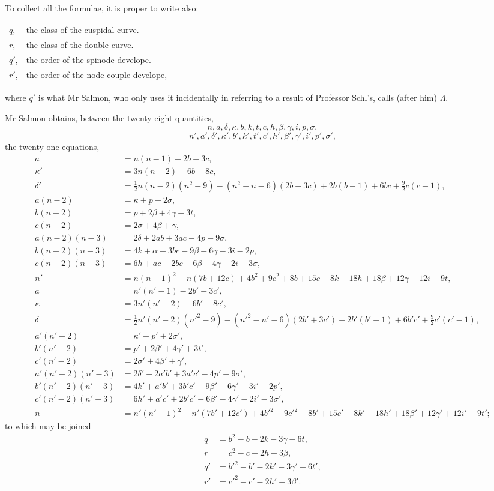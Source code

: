 \documentclass[11pt,a4paper]{book}
\theoremstyle{plain}
\begin{document}
To collect all the formulae, it is proper to write also:

\begin{tabular}{@{}ll@{}}
$q$, & the class of the cuspidal curve. \\
$r$, & the class of the double curve. \\
$q'$, & the order of the spinode develope. \\
$r'$, & the order of the node-couple develope, \\
\end{tabular}

where $q'$ is what Mr Salmon, who only uses it incidentally in referring to a result of Professor Schl\afli's, calls (after him) $\Lambda$.

Mr Salmon obtains, between the twenty-eight quantities,
\[
n,a,\delta,\kappa,b,k,t,c,h,\beta,\gamma,i,p,\sigma,
\]
\[
n',a',\delta',\kappa',b',k',t',c',h',\beta',\gamma',i',p',\sigma',
\]
the twenty-one equations,
\begin{align}
a &= n(n-1)-2b-3c,\\
\kappa' &= 3n(n-2)-6b-8c,\\
\delta' &= \tfrac{1}{2}n(n-2)(n^2-9)-(n^2-n-6)(2b+3c)+2b(b-1)+6bc+\tfrac{9}{2}c(c-1),\\
a(n-2) &= \kappa+p+2\sigma,\\
b(n-2) &= p+2\beta+4\gamma+3t,\\
c(n-2) &= 2\sigma+4\beta+\gamma,\\
a(n-2)(n-3) &= 2\delta+2ab+3ac-4p-9\sigma,\\
b(n-2)(n-3) &= 4k+\alpha+3bc-9\beta-6\gamma-3i-2p,\\
c(n-2)(n-3) &= 6h+ac+2bc-6\beta-4\gamma-2i-3\sigma,\\
n' &= n(n-1)^2-n(7b+12c)+4b^2+9c^2+8b+15c-8k-18h+18\beta+12\gamma+12i-9t,\tag{*}\\
a &= n'(n'-1)-2b'-3c',\\
\kappa &= 3n'(n'-2)-6b'-8c',\\
\delta &= \tfrac{1}{2}n'(n'-2)(n'^2-9)-(n'^2-n'-6)(2b'+3c')+2b'(b'-1)+6b'c'+\tfrac{9}{2}c'(c'-1),\\
a'(n'-2) &= \kappa'+p'+2\sigma',\\
b'(n'-2) &= p'+2\beta'+4\gamma'+3t',\\
c'(n'-2) &= 2\sigma'+4\beta'+\gamma',\\
a'(n'-2)(n'-3) &= 2\delta'+2a'b'+3a'c'-4p'-9\sigma',\\
b'(n'-2)(n'-3) &= 4k'+a'b'+3b'c'-9\beta'-6\gamma'-3i'-2p',\\
c'(n'-2)(n'-3) &= 6h'+a'c'+2b'c'-6\beta'-4\gamma'-2i'-3\sigma',\\
n &= n'(n'-1)^2-n'(7b'+12c')+4b'^2+9c'^2+8b'+15c'-8k'-18h'+18\beta'+12\gamma'+12i'-9t';\tag{*}
\end{align}
to which may be joined
\begin{align}
q &= b^2-b-2k-3\gamma-6t,\\
r &= c^2-c-2h-3\beta,\\
q' &= b'^2-b'-2k'-3\gamma'-6t',\\
r' &= c'^2-c'-2h'-3\beta'.
\end{align}
\end{document}
